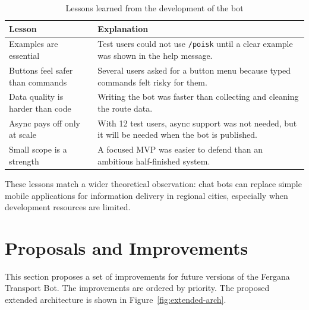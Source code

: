 \begin{table}[h]
\centering
\caption{Lessons learned from the development of the bot}
\label{tab:lessons}
\begin{tabular}{p{}p{}}
\hline
\textbf{Lesson} & \textbf{Explanation} \\
\hline
Examples are essential & Test users could not use \texttt{/poisk} until a
clear example was shown in the help message. \\
Buttons feel safer than commands & Several users asked for a button menu
because typed commands felt risky for them. \\
Data quality is harder than code & Writing the bot was faster than
collecting and cleaning the route data. \\
Async pays off only at scale & With 12 test users, async support was not
needed, but it will be needed when the bot is published. \\
Small scope is a strength & A focused MVP was easier to defend than an
ambitious half-finished system. \\
\hline
\end{tabular}
\end{table}

These lessons match a wider theoretical observation: chat bots can
replace simple mobile applications for information delivery in regional
cities, especially when development resources are limited. \cite{adamopoulou2020chatbots, kamberi2021telegram}

\section{Proposals and Improvements}
\label{sec:proposals}

This section proposes a set of improvements for future versions of the
Fergana Transport Bot. The improvements are ordered by priority. The
proposed extended architecture is shown in
Figure~\ref{fig:extended-arch}.


